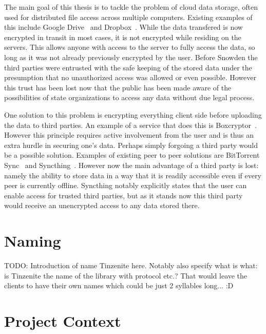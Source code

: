
The main goal of this thesis is to tackle the problem of cloud data storage, often used for distributed file access across multiple computers.
Existing examples of this include Google Drive~\cite{web:site:gdrive} and Dropbox~\cite{web:site:dropbox}.
While the data transfered is now encrypted in transit in most cases, it is not encrypted while residing on the servers.
This allows anyone with access to the server to fully access the data, so long as it was not already previously encrypted by the user.
Before Snowden the third parties were entrusted with the safe keeping of the stored data under the presumption that no unauthorized access was allowed or even possible.
However this trust has been lost now that the public has been made aware of the possibilities of state organizations to access any data without due legal process.

One solution to this problem is encrypting everything client side before uploading the data to third parties.
An example of a service that does this is Boxcryptor~\cite{web:site:boxcryptor}.
However this principle requires active involvement from the user and is thus an extra hurdle in securing one's data.
Perhaps simply forgoing a third party would be a possible solution.
Examples of existing peer to peer solutions are BitTorrent Sync~\cite{web:site:bittorrent_sync} and Syncthing~\cite{web:site:synthing}.
However now the main advantage of a third party is lost: namely the ability to store data in a way that it is readily accessible even if every peer is currently offline.
Syncthing notably explicitly states that the user can enable access for trusted third parties, but as it stands now this third party would receive an unencrypted access to any data stored there.

\section{Naming}

TODO: Introduction of name Tinzenite here.
Notably also specify what is what: is Tinzenite the name of the library with protocol etc.?
That would leave the clients to have their own names which could be just 2 syllables long... :D

\section{Project Context}

